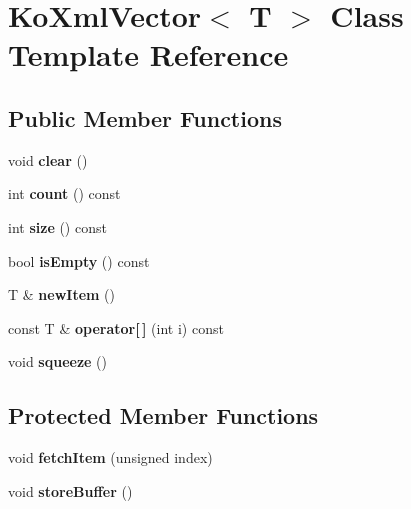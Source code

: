 \hypertarget{classKoXmlVector}{
\section{KoXmlVector$<$ T $>$ Class Template Reference}
\label{classKoXmlVector}
}
\subsection*{Public Member Functions}
\begin{DoxyCompactItemize}
\item 
\hypertarget{classKoXmlVector_af1f1ea04faf94f2f89489861feceaad6}{
void {\bfseries clear} ()}
\label{classKoXmlVector_af1f1ea04faf94f2f89489861feceaad6}

\item 
\hypertarget{classKoXmlVector_a1bd1777e7ef4099eeb63565eb9c22993}{
int {\bfseries count} () const }
\label{classKoXmlVector_a1bd1777e7ef4099eeb63565eb9c22993}

\item 
\hypertarget{classKoXmlVector_ad874b81d30fdb30afb2cd5d48839aa84}{
int {\bfseries size} () const }
\label{classKoXmlVector_ad874b81d30fdb30afb2cd5d48839aa84}

\item 
\hypertarget{classKoXmlVector_ac71b5dc250b8925d0e26905cdcd5e5a6}{
bool {\bfseries isEmpty} () const }
\label{classKoXmlVector_ac71b5dc250b8925d0e26905cdcd5e5a6}

\item 
\hypertarget{classKoXmlVector_ac0e777728850ecd63aec85566a3399c1}{
T \& {\bfseries newItem} ()}
\label{classKoXmlVector_ac0e777728850ecd63aec85566a3399c1}

\item 
\hypertarget{classKoXmlVector_ac8f0112165a89e60146e110f01ec73d4}{
const T \& {\bfseries operator\mbox{[}$\,$\mbox{]}} (int i) const }
\label{classKoXmlVector_ac8f0112165a89e60146e110f01ec73d4}

\item 
\hypertarget{classKoXmlVector_acd1d80b90fc14a419869cc39fd0733c3}{
void {\bfseries squeeze} ()}
\label{classKoXmlVector_acd1d80b90fc14a419869cc39fd0733c3}

\end{DoxyCompactItemize}
\subsection*{Protected Member Functions}
\begin{DoxyCompactItemize}
\item 
\hypertarget{classKoXmlVector_a0ab671fc2b3612fe941a81ebe9085859}{
void {\bfseries fetchItem} (unsigned index)}
\label{classKoXmlVector_a0ab671fc2b3612fe941a81ebe9085859}

\item 
\hypertarget{classKoXmlVector_a6c7d366cd6cdc52c30d3fe7f52098023}{
void {\bfseries storeBuffer} ()}
\label{classKoXmlVector_a6c7d366cd6cdc52c30d3fe7f52098023}

\end{DoxyCompactItemize}
